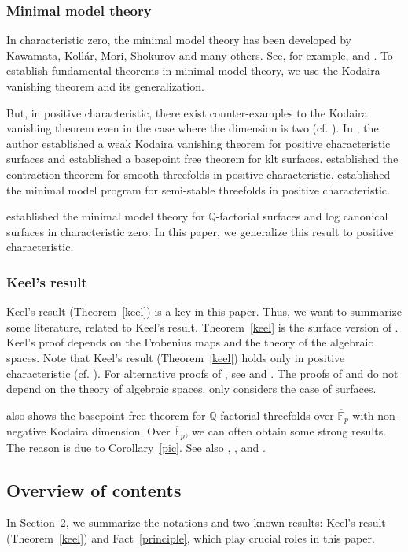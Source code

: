\documentclass[12pt,twoside]{amsart}
\theoremstyle{definition}
\newcommand{\Q}{$\mathbb{Q}$}
\begin{document}
\subsubsection{Minimal model theory}
In characteristic zero, 
the minimal model theory has been developed 
by Kawamata, Koll\'ar, Mori, Shokurov and many others. 
See, for example, \cite{KM} and \cite{KMM}. 
To establish fundamental theorems in minimal model theory, 
we use the Kodaira vanishing theorem and its generalization. 

But, in positive characteristic, 
there exist counter-examples to the Kodaira vanishing theorem 
even in the case where the dimension is two (cf. \cite{Raynaud}). 
In \cite{T}, the author established a weak Kodaira vanishing theorem 
for positive characteristic surfaces and 
established a basepoint free theorem for klt surfaces. 
\cite{Kollar} established the contraction theorem for smooth threefolds in positive characteristic. 
\cite{Kawamata} established the minimal model program for 
semi-stable threefolds in positive characteristic. 

\cite{Fujino} established the minimal model theory 
for \Q-factorial surfaces and log canonical surfaces in characteristic zero. 
In this paper, we generalize this result to positive characteristic. 

\subsubsection{Keel's result} 
Keel's result (Theorem~\ref{keel}) is a key in this paper. 
Thus, we want to summarize some literature, related to Keel's result. 
Theorem~\ref{keel} is the surface version of \cite[Theorem~0.2]{Keel}. 
Keel's proof depends on the Frobenius maps and the theory of the algebraic spaces. 
Note that Keel's result (Theorem~\ref{keel}) holds only in positive characteristic 
(cf. \cite[Section~3]{Keel}). 
For alternative proofs of \cite[Theorem~0.2]{Keel}, 
see \cite{CMM} and \cite{FT}. 
The proofs of \cite{CMM} and \cite{FT} do not depend on the theory of algebraic spaces. 
\cite{FT} only considers the case of surfaces. 

\cite{Keel} also shows the basepoint free theorem for \Q-factorial threefolds 
over $\overline{\mathbb F}_p$ with non-negative Kodaira dimension. 
Over $\overline{\mathbb F}_p$, we can often obtain some strong results. 
The reason is due to Corollary~\ref{pic}. 
See also \cite{Artin}, \cite{Keel2}, \cite{Masek} and \cite{Totaro}. 


\subsection{Overview of contents}
In Section~2, we summarize the notations and two known results: 
Keel's result (Theorem~\ref{keel}) and Fact~\ref{principle}, 
which play crucial roles in this paper. 
\end{document}
